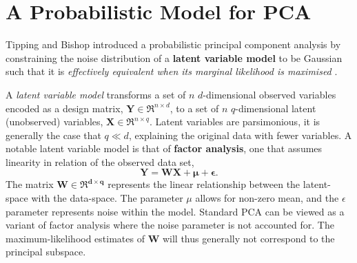 \documentclass[ %
author={Dillon Keith Diep},
supervisor={Dr. Carl Henrik Ek},
degree={MEng},
title={ART-CG:},
subtitle={Assisted Real-time Content Generation of 3D Hair by Learning Manifolds},
type={Research},
year={2017} ]{dissertation}
\begin{document}
\section{A Probabilistic Model for PCA}
Tipping and Bishop introduced a probabilistic principal component analysis by constraining the noise distribution of a \textbf{latent variable model} to be Gaussian such that it is \textit{effectively equivalent when its marginal likelihood is maximised} \cite{ppca}.

A \textit{latent variable model} transforms a set of $n$ $d$-dimensional observed variables encoded as a design matrix, $\bm{Y}\in\Re^{n \times d}$, to a set of $n$ $q$-dimensional latent (unobserved) variables, $\bm{X}\in\Re^{n \times q}$. Latent variables are parsimonious, it is generally the case that $q \ll d$, explaining the original data with fewer variables. A notable latent variable model is that of \textbf{factor analysis}, one that assumes linearity in relation of the observed data set,
\begin{equation} \label{ppca:fa}
\bm{Y=WX+\mu+\epsilon}.
\end{equation}
The matrix $\bm{W \in \Re^{d \times q}}$ represents the linear relationship between the latent-space with the data-space.
The parameter $\mu$ allows for non-zero mean, and the $\epsilon$ parameter represents noise within the model. Standard PCA can be viewed as a variant of factor analysis where the noise parameter is not accounted for. The maximum-likelihood estimates of $\bm{W}$ will thus generally not correspond to the principal subspace. 
\end{document}
